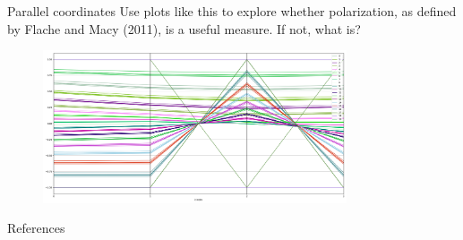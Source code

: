 \documentclass[11pt]{beamer}
\begin{document}
\begin{frame}{Parallel coordinates}
  Use plots like this to explore whether polarization, as defined by 
  Flache and Macy (2011), is a useful measure. If not, what is?
  \begin{figure}
    \centering
    \includegraphics[width=0.8\textwidth]{parallel_coords_k=4.png}
  \end{figure}
\end{frame}

\begin{frame}{References}


\setlength{\bibleftmargin}{.125in}
\setlength{\bibindent}{-\bibleftmargin}

{\tiny

}
\end{frame}
\end{document}
